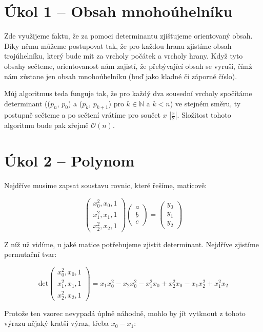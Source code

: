 \documentclass{fkssolpub}
\author{Ondřej Sedláček}
\begin{document}
\section{Úkol 1 -- Obsah mnohoúhelníku}

Zde využijeme faktu, že za pomoci determinantu zjišťujeme orientovaný obsah.
Díky němu můžeme postupovat tak, že pro každou hranu zjistíme obsah trojúhelníku,
který bude mít za vrcholy počátek a vrcholy hrany. Když tyto obsahy sečteme,
orientovanost nám zajistí, že přebývající obsah se vyruší, čímž nám zůstane
jen obsah mnohoúhelníku (buď jako kladné či záporné číslo).

Můj algoritmus teda funguje tak, že pro každý dva sousední vrcholy spočítáme
determinant (($p_n$, $p_0$) a ($p_k$, $p_{k+1}$) pro $k \in \mathbb{N}$ 
a $k < n$) ve stejném směru, ty postupně sečteme a po sečtení vrátíme pro součet $x$
$\left|\frac{x}{2}\right|$. Složitost tohoto algoritmu bude pak zřejmě
$\mathcal{O}(n)$.

\section{Úkol 2 -- Polynom}

Nejdříve musíme zapsat soustavu rovnic, které řešíme, maticově:

\[
  \begin{pmatrix}
    x_0^2, x_0, 1 \\ x_1^2, x_1, 1 \\ x_2^2, x_2, 1
  \end{pmatrix} 
  \begin{pmatrix}
    a \\ b \\ c
  \end{pmatrix} = \begin{pmatrix}
    y_0 \\ y_1 \\ y_2
  \end{pmatrix}
\]

Z níž už vidíme, u jaké matice potřebujeme zjistit determinant. Nejdříve zjistíme
permutační tvar:

\[
  \text{det} \begin{pmatrix}
    x_0^2, x_0, 1 \\ x_1^2, x_1, 1 \\ x_2^2, x_2, 1
  \end{pmatrix} = x_1 x_0^2 - x_2 x_0^2 - x_1^2 x_0 + x_2^2 x_0 - x_1 x_2^2 + x_1^2 x_2
\]

Protože ten vzorec nevypadá úplně náhodně, mohlo by jít vytknout z tohoto výrazu
nějaký kratší výraz, třeba $x_0 - x_1$:
\end{document}
